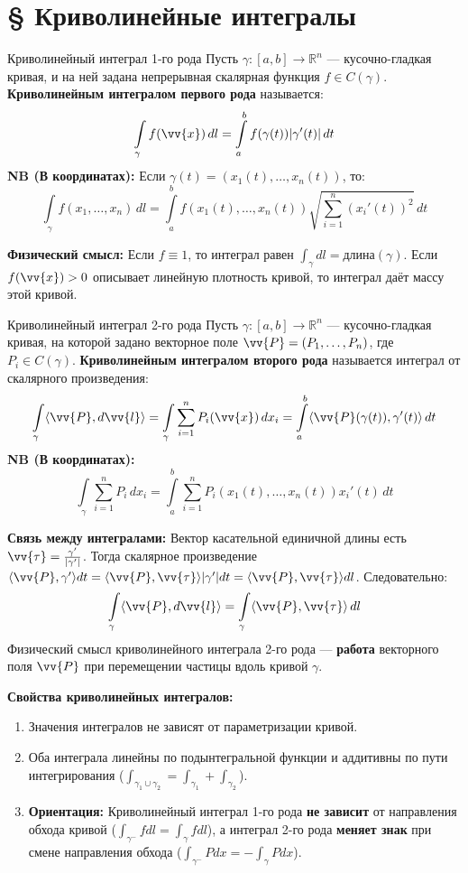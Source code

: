 \documentclass[12pt,a4paper]{article}
\begin{document}
\section{§ Криволинейные интегралы}

\begin{Definition}{Криволинейный интеграл 1-го рода}{}
Пусть $\gamma: [a,b] \to \mathbb{R}^n$ — кусочно-гладкая кривая, и на ней задана непрерывная скалярная функция $f \in C(\gamma)$. \textbf{Криволинейным интегралом первого рода} называется:
$$ \int\limits_\gamma f(\vv{x}) \, dl = \int\limits_a^b f(\gamma(t)) |\gamma'(t)| \, dt $$
\textbf{NB (В координатах):} Если $\gamma(t) = (x_1(t), \dots, x_n(t))$, то:
$$ \int\limits_\gamma f(x_1, \dots, x_n) \, dl = \int\limits_a^b f(x_1(t), \dots, x_n(t)) \sqrt{\sum\limits_{i=1}^n (x_i'(t))^2} \, dt $$
\end{Definition}

\textbf{Физический смысл:} 
Если $f \equiv 1$, то интеграл равен $\int_\gamma dl = \text{длина}(\gamma)$.
Если $f(\vv{x}) > 0$ описывает линейную плотность кривой, то интеграл даёт массу этой кривой.

\begin{Definition}{Криволинейный интеграл 2-го рода}{}
Пусть $\gamma: [a,b] \to \mathbb{R}^n$ — кусочно-гладкая кривая, на которой задано векторное поле $\vv{P} = (P_1, \dots, P_n)$, где $P_i \in C(\gamma)$. \textbf{Криволинейным интегралом второго рода} называется интеграл от скалярного произведения:
$$ \int\limits_\gamma \langle \vv{P}, d\vv{l} \rangle = \int\limits_\gamma \sum\limits_{i=1}^n P_i(\vv{x}) \, dx_i = \int\limits_a^b \langle \vv{P}(\gamma(t)), \gamma'(t) \rangle \, dt $$
\textbf{NB (В координатах):} 
$$ \int\limits_\gamma \sum\limits_{i=1}^n P_i \, dx_i = \int\limits_a^b \sum\limits_{i=1}^n P_i(x_1(t), \dots, x_n(t)) x_i'(t) \, dt $$
\end{Definition}

\textbf{Связь между интегралами:} Вектор касательной единичной длины есть $\vv{\tau} = \frac{\gamma'}{|\gamma'|}$. Тогда скалярное произведение $\langle \vv{P}, \gamma' \rangle dt = \langle \vv{P}, \vv{\tau} \rangle |\gamma'| dt = \langle \vv{P}, \vv{\tau} \rangle dl$. Следовательно:
$$ \int\limits_\gamma \langle \vv{P}, d\vv{l} \rangle = \int\limits_\gamma \langle \vv{P}, \vv{\tau} \rangle \, dl $$
Физический смысл криволинейного интеграла 2-го рода — \textbf{работа} векторного поля $\vv{P}$ при перемещении частицы вдоль кривой $\gamma$.

\textbf{Свойства криволинейных интегралов:}
\begin{enumerate}
    \item Значения интегралов не зависят от параметризации кривой.
    \item Оба интеграла линейны по подынтегральной функции и аддитивны по пути интегрирования ($\int_{\gamma_1 \cup \gamma_2} = \int_{\gamma_1} + \int_{\gamma_2}$).
    \item \textbf{Ориентация:} Криволинейный интеграл 1-го рода \textbf{не зависит} от направления обхода кривой ($\int_{\gamma^-} f dl = \int_\gamma f dl$), а интеграл 2-го рода \textbf{меняет знак} при смене направления обхода ($\int_{\gamma^-} P dx = -\int_\gamma P dx$).
\end{enumerate}
\end{document}
